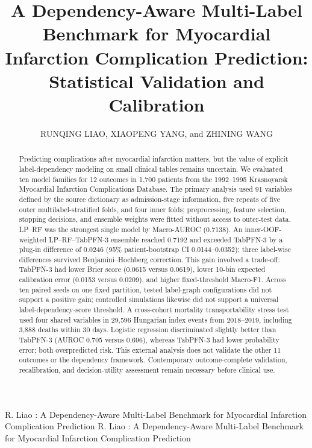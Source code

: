\documentclass{ieeeaccess}
\begin{document}

\title{A Dependency-Aware Multi-Label Benchmark for Myocardial Infarction Complication Prediction: Statistical Validation and Calibration}

\author{\uppercase{Runqing Liao}, \uppercase{Xiaopeng Yang}, and \uppercase{Zhining Wang}}

\address[1]{School of Mathematics and Statistics, Hanshan Normal University, Chaozhou 521041, China}


\markboth
{R. Liao \headeretal: A Dependency-Aware Multi-Label Benchmark for Myocardial Infarction Complication Prediction}
{R. Liao \headeretal: A Dependency-Aware Multi-Label Benchmark for Myocardial Infarction Complication Prediction}


\begin{abstract}
Predicting complications after myocardial infarction matters, but the value of explicit label-dependency modeling on small clinical tables remains uncertain. We evaluated ten model families for 12 outcomes in 1,700 patients from the 1992--1995 Krasnoyarsk Myocardial Infarction Complications Database. The primary analysis used 91 variables defined by the source dictionary as admission-stage information, five repeats of five outer multilabel-stratified folds, and four inner folds; preprocessing, feature selection, stopping decisions, and ensemble weights were fitted without access to outer-test data. LP--RF was the strongest single model by Macro-AUROC (0.7138). An inner-OOF-weighted LP--RF--TabPFN-3 ensemble reached 0.7192 and exceeded TabPFN-3 by a plug-in difference of 0.0246 (95\% patient-bootstrap CI 0.0144--0.0352); three label-wise differences survived Benjamini--Hochberg correction. This gain involved a trade-off: TabPFN-3 had lower Brier score (0.0615 versus 0.0619), lower 10-bin expected calibration error (0.0153 versus 0.0209), and higher fixed-threshold Macro-F1. Across ten paired seeds on one fixed partition, tested label-graph configurations did not support a positive gain; controlled simulations likewise did not support a universal label-dependency-score threshold. A cross-cohort mortality transportability stress test used four shared variables in 29,596 Hungarian index events from 2018--2019, including 3,888 deaths within 30 days. Logistic regression discriminated slightly better than TabPFN-3 (AUROC 0.705 versus 0.696), whereas TabPFN-3 had lower probability error; both overpredicted risk. This external analysis does not validate the other 11 outcomes or the dependency framework. Contemporary outcome-complete validation, recalibration, and decision-utility assessment remain necessary before clinical use.
\end{abstract}
\end{document}
